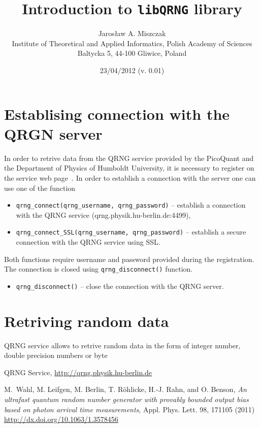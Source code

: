 \documentclass[a4paper,11pt]{article}
\title{Introduction to \texttt{libQRNG} library}
\author{Jaros{\l}aw A. Miszczak\\Institute of Theoretical and Applied Informatics, Polish Academy of Sciences\\ Baltycka 5, 44-100 Gliwice, Poland}
\date{23/04/2012 (v. 0.01)}
\begin{document}
\maketitle

\section{Establising connection with the QRGN server}

In order to retrive data from the QRNG service provided by the PicoQuant and the
Department of Physics of Humboldt University, it is necessary to register on the
service web page~\cite{qrng-www}. In order to establish a connection with the server one can use
one of the function
\begin{itemize}
    \item \lstinline{qrng_connect(qrng_username, qrng_password)} -- establish a
      connection with the QRNG service (qrng.physik.hu-berlin.de:4499),

    \item \lstinline{qrng_connect_SSL(qrng_username, qrng_password)} --
      establish a secure connection with the QRNG service using SSL.
\end{itemize}
Both functions require username and password provided during the registration.
The connection is closed using \lstinline{qrng_disconnect()} function.
\begin{itemize}
	\item \lstinline{qrng_disconnect()} -- close the connection with the QRNG
	server.
\end{itemize}

\section{Retriving random data}
QRNG service allows to retrive random data in the form of integer number, double precision numbers or byte


\begin{thebibliography}{2}
     QRNG Service, \url{http://qrng.physik.hu-berlin.de}

     M.~Wahl, M. Leifgen, M. Berlin, T. R\"ohlicke,
       H.-J. Rahn, and O. Benson, \emph{An ultrafast quantum random number
       generator with provably bounded output bias based on photon arrival time
       measurements}, Appl. Phys. Lett. 98, 171105 (2011)
       \url{http://dx.doi.org/10.1063/1.3578456}
\end{thebibliography}
\end{document}
